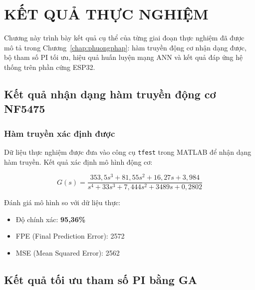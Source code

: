
\chapter{KẾT QUẢ THỰC NGHIỆM}
\label{chap:ketqua}

Chương này trình bày kết quả cụ thể của từng giai đoạn thực nghiệm đã được mô tả
trong Chương~\ref{chap:phuongphap}: hàm truyền động cơ nhận dạng được, bộ tham số
PI tối ưu, hiệu quả huấn luyện mạng ANN và kết quả đáp ứng hệ thống trên phần cứng
ESP32.


\section{Kết quả nhận dạng hàm truyền động cơ NF5475}

\subsection{Hàm truyền xác định được}

Dữ liệu thực nghiệm được đưa vào công cụ \texttt{tfest} trong MATLAB để nhận dạng
hàm truyền. Kết quả xác định mô hình động cơ:

\begin{equation}
    G(s) = \frac{353{,}5s^3 + 81{,}55s^2 + 16{,}27s + 3{,}984}
                {s^4 + 33s^3 + 7{,}444s^2 + 3489s + 0{,}2802}
    \label{eq:transfer_function}
\end{equation}

Đánh giá mô hình so với dữ liệu thực:
\begin{itemize}
    \item Độ chính xác: \textbf{95,36\%}
    \item FPE (Final Prediction Error): 2572
    \item MSE (Mean Squared Error): 2562
\end{itemize}


\section{Kết quả tối ưu tham số PI bằng GA}

